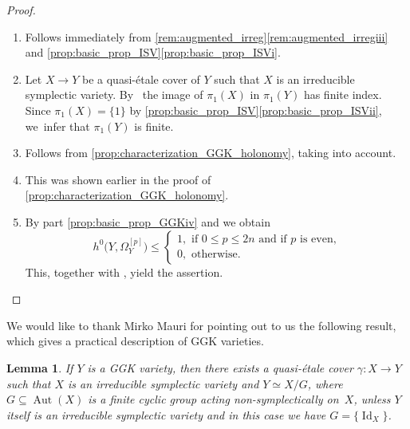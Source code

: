 \documentclass[10pt]{amsart}
\newcommand{\skpt}{\par\smallskip\noindent}
\theoremstyle{plain}
\newtheorem{lem}[thm]{Lemma}
\theoremstyle{definition}
\DeclareMathOperator{\Id}{Id}
\DeclareMathOperator{\Aut}{Aut}
\begin{document}
\skpt
\begin{proof}
\begin{enumerate}
\item
Follows immediately from \autoref{rem:augmented_irreg}\eqref{rem:augmented_irregiii} and \autoref{prop:basic_prop_ISV}\eqref{prop:basic_prop_ISVi}.

\item
Let $X \to Y$ be a quasi-étale cover of $Y$ such that $X$ is an irreducible symplectic variety. By~\cite[Prop.\,1.3]{Campana91} the image of $\pi_1(X)$ in $\pi_1(Y)$ has finite index. Since $\pi_1(X) = \{ 1 \}$ by \autoref{prop:basic_prop_ISV}\eqref{prop:basic_prop_ISVii}, we~infer that $\pi_1(Y)$ is finite.

\item
Follows from \autoref{prop:characterization_GGK_holonomy}, taking \cite[Remind.\,2.14 \& Rem.\,5.2]{GGK19} into account.

\item
This was shown earlier in the proof of \autoref{prop:characterization_GGK_holonomy}.

\item
By part \eqref{prop:basic_prop_GGKiv} and \cite[Th.\,12.2 (12.2.2)]{GGK19} we obtain\vspace*{-3pt}
\[
h^0 \bigl(Y,\Omega_Y^{[p]} \bigr) \leq
\begin{cases}
1, \text{ if } 0 \leq p \leq 2n \text{ and if }p\text{ is even,}\\
0, \text{ otherwise}.
\end{cases}
\]
This, together with \cite[Prop.\,6.9]{GKP16b}, yield the assertion.\qedhere
\end{enumerate}
\end{proof}

We would like to thank Mirko Mauri for pointing out to us the following result, which gives a practical description of GGK varieties.

\begin{lem}
\label{lem:GGK_cover}
If $Y$ is a GGK variety, then there exists a quasi-étale cover $\gamma \colon X \to Y$ such that $X$ is an irreducible symplectic variety and $Y\simeq X/G$, where $G\subseteq \Aut(X)$ is a finite cyclic group acting non-symplectically on~$X$, unless $Y$ itself is an irreducible symplectic variety and in this case we have $G=\{ \Id_X \}$.
\end{lem}
\end{document}
